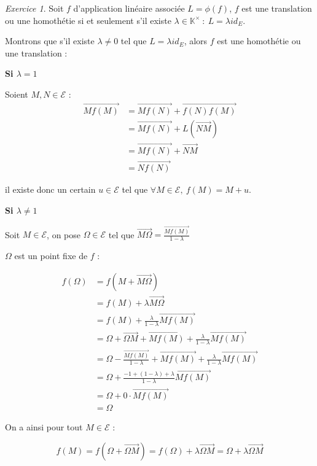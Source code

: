 \documentclass[]{article}
\theoremstyle{remark}
\newtheorem{myexer}{Exercice}
\theoremstyle{definition}
\newenvironment{proofpart}[1]{
	\noindent
	{\textbf{\boldmath #1}}
}{
	\checkmark
}
\begin{document}
\begin{myexer}
	Soit $f$ d'application linéaire associée $L = \phi(f)$, $f$ est une translation ou une homothétie si et seulement s'il existe $\lambda \in \mathbb{K}^{\times} ~ : ~ L = \lambda id_E$.
	
	Montrons que s'il existe $\lambda \neq 0$ tel que $L = \lambda id_E$, alors $f$ est une homothétie ou une translation :
	
	\begin{proofpart}{Si $\lambda = 1$}

		Soient $M, N \in \mathcal{E}$ :
		$$
		\begin{aligned}
			\overrightarrow{M f(M)} &= \overrightarrow{M f(N)} + \overrightarrow{f(N) f(M)} \\
			& = \overrightarrow{M f(N)} + L\left(\overrightarrow{NM}\right)\\
			& = \overrightarrow{M f(N)} + \overrightarrow{NM} \\
			& = \overrightarrow{N f(N)}
		\end{aligned}
		$$
		
		il existe donc un certain $u \in \mathcal{E}$ tel que $\forall M \in \mathcal{E}, ~ f(M) = M+u$.
		
	\end{proofpart}
	
	
		\begin{proofpart}{Si $\lambda \neq 1$}
	
			Soit $M \in \mathcal{E}$, on pose $\Omega \in \mathcal{E}$ tel que $\displaystyle \overrightarrow{M\Omega} = \frac{\overrightarrow{Mf(M)}}{1 - \lambda}$

			$\Omega$ est un point fixe de $f$ :

			$$
			\begin{aligned}
				f(\Omega) &=f(M + \overrightarrow{M\Omega}) \\
				&=f(M) + \lambda \overrightarrow{M\Omega} \\
				&=f(M) + \frac{\lambda}{1-\lambda} \overrightarrow{Mf(M)}\\
				&= \Omega + \overrightarrow{\Omega M} + \overrightarrow{M f(M)} + \frac{\lambda}{1-\lambda}\overrightarrow{Mf(M)}\\
				&=\Omega - \frac{\overrightarrow{M f(M)}}{1-\lambda} + \overrightarrow{M f(M)} + \frac{\lambda}{1 - \lambda} \overrightarrow{M f(M)} \\
				&=\Omega + \frac{-1 + (1 - \lambda) + \lambda}{1 - \lambda} \overrightarrow{M f(M)}\\
				&=\Omega + 0 \cdot \overrightarrow{M f(M)}\\
				&=\Omega
			\end{aligned}
			$$
			
			On a ainsi pour tout $M \in \mathcal{E}$ :
			
			$$f(M) = f(\Omega + \overrightarrow{\Omega M}) = f(\Omega) + \lambda \overrightarrow{\Omega M} = \Omega + \lambda \overrightarrow{\Omega M}$$
			
		\end{proofpart}
	
\end{myexer}
\end{document}
